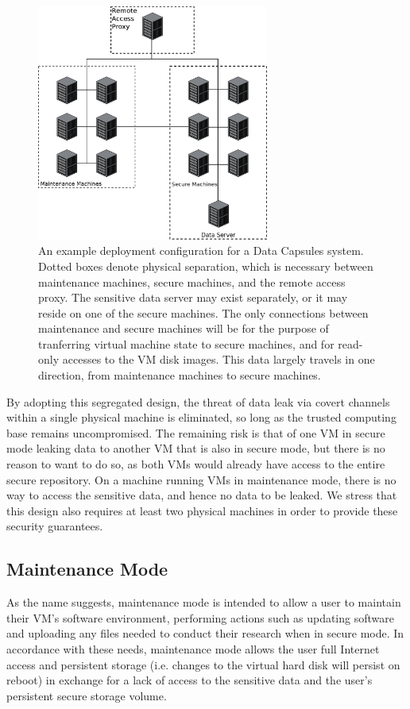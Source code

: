 \documentclass{acm_proc_article-sp}
\begin{document}
\begin{figure}[ht!]
\center
\includegraphics[width=3.0in]{figures/configuration}

\caption{An example deployment configuration for a Data Capsules system.
Dotted boxes denote physical separation, which is necessary between maintenance
machines, secure machines, and the remote access proxy.  The sensitive data
server may exist separately, or it may reside on one of the secure machines.
The only connections between maintenance and secure machines will be for the
purpose of tranferring virtual machine state to secure machines, and for
read-only accesses to the VM disk images.  This data largely travels in one
direction, from maintenance machines to secure machines.}

\label{fig:configuration}
\end{figure}

By adopting this segregated design, the threat of data leak via covert channels
within a single physical machine is eliminated, so long as the trusted computing
base remains uncompromised.  The remaining risk is that of one VM in secure mode
leaking data to another VM that is also in secure mode, but there is no reason
to want to do so, as both VMs would already have access to the entire secure
repository.  On a machine running VMs in maintenance mode, there is no way to
access the sensitive data, and hence no data to be leaked.  We stress that this
design also requires at least two physical machines in order to provide these
security guarantees.

\subsection{Maintenance Mode}

As the name suggests, maintenance mode is intended to allow a user to maintain
their VM's software environment, performing actions such as updating software
and uploading any files needed to conduct their research when in secure mode.
In accordance with these needs, maintenance mode allows the user full Internet
access and persistent storage (i.e.  changes to the virtual hard disk will
persist on reboot) in exchange for a lack of access to the sensitive data and
the user's persistent secure storage volume.
\end{document}
